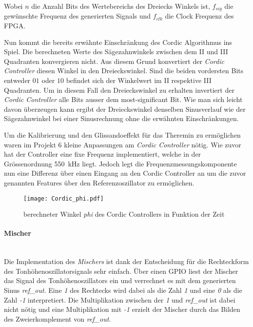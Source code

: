 Wobei \(n\) die Anzahl Bits des Wertebereichs des Dreiecks Winkels ist, \(f_{sig}\) die gewünschte Frequenz des generierten Signals und \(f_{clk}\) die Clock Frequenz des FPGA.

Nun kommt die bereits erwähnte Einschränkung des Cordic Algorithmus ins Spiel. Die berechneten Werte des Sägezahnwinkels zwischen dem II und III Quadranten konvergieren nicht. Aus diesem Grund konvertiert der \textit{Cordic Controller} diesen Winkel in den Dreieckswinkel. Sind die beiden vordersten Bits entweder \(01\) oder \(10\) befindet sich der Winkelwert im II respektive III Quadranten. Um in diesem Fall den Dreieckswinkel zu erhalten invertiert der \textit{Cordic Controller} alle Bits ausser dem most-significant Bit. Wie man sich leicht davon überzeugen kann ergibt der Dreieckswinkel denselben Sinusverlauf wie der Sägezahnwinkel bei einer Sinusrechnung ohne die erwähnten Einschränkungen. \cite{Cordic}

Um die Kalibrierung und den Glissandoeffekt für das Theremin zu ermöglichen waren im Projekt 6 kleine Anpassungen am \textit{Cordic Controller} nötig. Wie zuvor hat der Controller eine fixe Frequenz implementiert, welche in der Grössenordnung \SI{550}{kHz} liegt. Jedoch legt die Frequenzmessungskomponente nun eine Differenz über einen Eingang an den Cordic Controller an um die zuvor genannten Features über den Referenzoszillator zu ermöglichen.


\begin{figure}[t]
	\centering
	\texttt{[image: Cordic\_phi.pdf]}
	\caption{berechneter Winkel \textit{phi} des Cordic Controllers in Funktion der Zeit} 
	\label{img:Cordic_phi}
\end{figure}  


\paragraph{Mischer}\mbox{}\\

Die Implementation des \textit{Mischers} ist dank der Entscheidung für die Rechteckform des Tonhöhenoszillatorsignals sehr einfach. Über einen GPIO liest der Mischer das Signal des Tonhöhenoszillators ein und verrechnet es mit dem generierten Sinus \textit{ref\_out}. Eine \textit{1} des Rechtecks wird dabei als die Zahl \textit{1} und eine \textit{0} als die Zahl \textit{-1} interpretiert. Die Multiplikation zwischen der \textit{1} und \textit{ref\_out} ist dabei nicht nötig und eine Multiplikation mit \textit{-1} erzielt der Mischer durch das Bilden des Zweierkomplement von \textit{ref\_out}.


